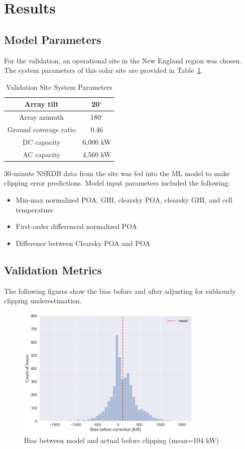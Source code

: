 \documentclass[conference]{IEEEtran}
\begin{document}
\section{Results}

\subsection{Model Parameters}

For the validation, an operational site in the New England region was chosen. The system parameters of this solar site are provided in Table~\ref{table1}.

\begin{table}[htbp]
\caption{Validation Site System Parameters}
\begin{center}
\begin{tabular}{ |c|c| } 
\hline
Array tilt & 20$^{\circ}$ \\
\hline
Array azimuth & 180$^{\circ}$ \\
\hline
Ground coverage ratio & 0.46 \\
\hline
DC capacity & 6,000 kW \\
\hline
AC capacity & 4,560 kW \\
\hline
\end{tabular}
\end{center}
\label{table1}
\end{table}

30-minute NSRDB data from the site was fed into the ML model to make clipping error predictions. Model input parameters included the following:
\begin{itemize}
\item Min-max normalized POA, GHI, clearsky POA, clearsky GHI, and cell temperature
\item First-order differenced normalized POA
\item Difference between Clearsky POA and POA
\end{itemize}

\subsection{Validation Metrics}
The following figures show the bias before and after adjusting for subhourly clipping underestimation.

\begin{figure}[htbp]
\centerline{\includegraphics[width=9cm]{Error_before_correction_3.png}}
\caption{Bias between model and actual before clipping (mean=104 kW)}
\label{fig:before-clipping-error}
\end{figure}
\end{document}
